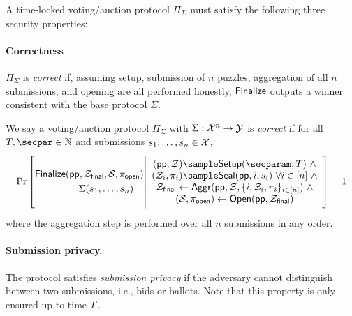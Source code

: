 A time-locked voting/auction protocol $\Pi_\Sigma$ must satisfy the following three security properties:

\paragraph{Correctness} 
$\Pi_\Sigma$ is \emph{correct} if, assuming setup, submission of $n$ puzzles, aggregation of all $n$ submissions, and opening are all performed honestly, $\sf Finalize$ outputs a winner consistent with the base protocol $\Sigma$.

\begin{definition}[Correctness]\label{def:correctness_cicada}
We say a voting/auction protocol $\Pi_\Sigma$ with $\Sigma: \mathcal{X}^n \to \mathcal{Y}$ is \emph{correct} if for all $\timeT,\secpar \in \mathbb{N}$ and submissions $s_1, \dots, s_n \in \mathcal{X}$,
\[
    \Pr\left[
        \begin{aligned}
            &\\
            \Finalize &(\pparam, \Z_{\sf final}, \mathcal{S}, \pi_{\sf open}) \\
            &= \Sigma(s_1, \dots, s_n)\\
            &\\
        \end{aligned}
        \middle|
        \begin{array}{c}
            (\pparam, \Z) \sample \Setup(\secparam, \timeT)~\land\\
            (\Z_i, \pi_i) \sample \Seal(\pparam, i, s_i)~\forall i \in [n]~\land\\
            \Z_{\sf final} \gets \Aggr(\pparam, \Z, \{i, \Z_i, \pi_i\}_{i \in [n]})~\land\\
            (\mathcal{S}, \pi_{\sf open}) \gets \Open(\pparam, \Z_{\sf final}) \\
        \end{array}
    \right] = 1
\]
where the aggregation step is performed over all $n$ submissions in any order.
\end{definition}

\paragraph{Submission privacy.} 
The protocol satisfies \emph{submission privacy} if the adversary cannot distinguish between two submissions, i.e., bids or ballots. Note that this property is only ensured up to time $T$.

